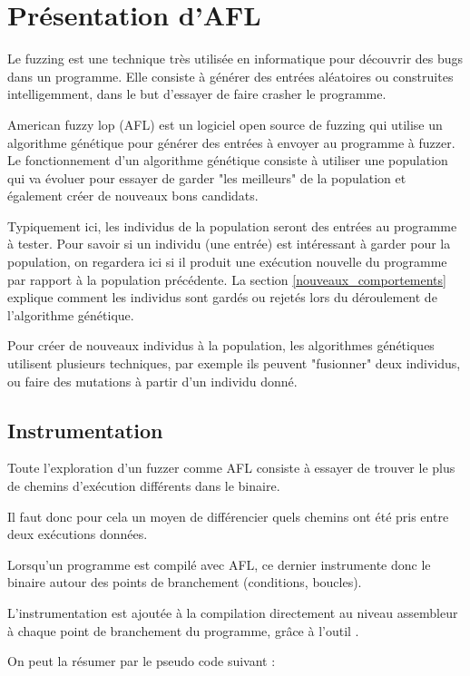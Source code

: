 \chapter{Présentation d'AFL}

Le fuzzing est une technique très utilisée en informatique pour découvrir
des bugs dans un programme. Elle consiste à générer des entrées aléatoires
ou construites intelligemment, dans le but d'essayer de faire crasher le
programme.

American fuzzy lop (AFL) est un logiciel open source de fuzzing qui utilise
un algorithme génétique pour générer des entrées à envoyer au programme à
fuzzer. Le fonctionnement d'un algorithme génétique consiste à utiliser
une population qui va évoluer pour essayer de garder "les meilleurs" de la
population et également créer de nouveaux bons candidats.

Typiquement ici, les individus de la population seront des entrées au
programme à tester. Pour savoir si un individu (une entrée) est intéressant
à garder pour la population, on regardera ici si il produit une
exécution nouvelle du programme par rapport à la population précédente. La
section \ref{nouveaux_comportements} explique comment les individus sont
gardés ou rejetés lors du déroulement de l'algorithme génétique.

Pour créer de nouveaux individus à la population, les algorithmes
génétiques utilisent plusieurs techniques, par exemple ils peuvent
"fusionner" deux individus, ou faire des mutations à partir d'un individu
donné.

\section{Instrumentation}\label{instrumentation}

Toute l'exploration d'un fuzzer comme AFL consiste à  essayer de trouver le
plus de chemins d'exécution différents dans le binaire.

Il faut donc pour cela un moyen de différencier quels chemins ont été pris
entre deux exécutions données.

Lorsqu'un programme est compilé avec AFL, ce dernier instrumente donc le
binaire autour des points de branchement (conditions, boucles).

L'instrumentation est ajoutée à la compilation directement au niveau
assembleur à chaque point de branchement du programme, grâce à l'outil
.

On peut la résumer par le pseudo code suivant :

